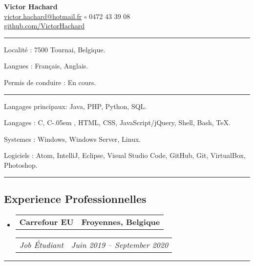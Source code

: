 \documentclass[10pt,letterpaper]{article}
\makeatletter
\newcommand{\Csharp}{%
  {\settoheight{\dimen0}{C}C\kern-.05em \resizebox{!}{\dimen0}{\raisebox{\depth}{\#}}}}
\newenvironment{indentsection}[1]
{\begin{list}{}
  {\setlength{\leftmargin}{#1}} \item[]
}
{\end{list}}
\newcommand{\headerrow}[2]
{\begin{tabular*}{\linewidth}{l@{\extracolsep{\fill}}r}
  #1 &
  #2 \\
\end{tabular*}}
\makeatother
\begin{document}
\begin{center}
  \huge \textbf{Victor Hachard} \\
  \large
  \href{mailto:victor.hachard@hotmail.fr}{victor.hachard@hotmail.fr}
  $\circ$
  0472 43 39 08
  \\
  \href{http://www.github.com/VictorHachard}{github.com/VictorHachard}
  \vspace{-0.2em}
\end{center}


\hrule
\begin{indentsection}{\parindent}
\begin{description*}
  \item[Localité :] 7500 Tournai, Belgique.
  \item[Langues :] Français, Anglais.
  \item[Permis de conduire :] En cours.
\end{description*}
\end{indentsection}


\hrule
\begin{indentsection}{\parindent}
\begin{description*}
  \item[Langages principaux:] Java, PHP, Python, SQL.
  \item[Langages :]  C, \Csharp, HTML, CSS,  JavaScript/jQuery, Shell,
  Bash, TeX.
  \item[Systemes :] Windows, Windows Server, Linux.
  \item[Logiciels :] Atom, IntelliJ, Eclipse, Visual Studio Code, GitHub, Git,
  VirtualBox, Photoshop.
\end{description*}
\end{indentsection}


\hrule
\vspace{-0.4em}
\subsection*{Experience Professionnelles}
\begin{itemize}
  \parskip=0.1em

  \item
  \headerrow
    {\textbf{Carrefour EU}}
    {\textbf{Froyennes, Belgique}}
  \headerrow
    {\emph{Job Étudiant}}
    {\emph{Juin 2019 -- September 2020}}
  \end{itemize}


\hrule
\vspace{-0.4em}
\end{document}

